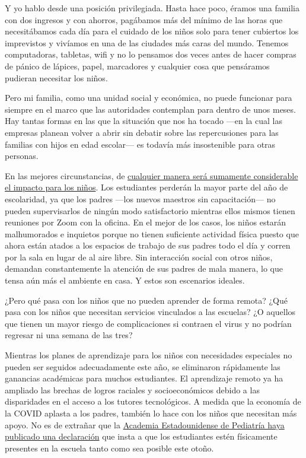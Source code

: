 Y yo hablo desde una posición privilegiada. Hasta hace poco, éramos una
familia con dos ingresos y con ahorros, pagábamos más del mínimo de las
horas que necesitábamos cada día para el cuidado de los niños solo para
tener cubiertos los imprevistos y vivíamos en una de las ciudades más
caras del mundo. Tenemos computadoras, tabletas, wifi y no lo pensamos
dos veces antes de hacer compras de pánico de lápices, papel, marcadores
y cualquier cosa que pensáramos pudieran necesitar los niños.

Pero mi familia, como una unidad social y económica, no puede funcionar
para siempre en el marco que las autoridades contemplan para dentro de
unos meses. Hay tantas formas en las que la situación que nos ha tocado
---en la cual las empresas planean volver a abrir sin debatir sobre las
repercusiones para las familias con hijos en edad escolar--- es todavía
más insostenible para otras personas.

En las mejores circunstancias, de
\href{https://www.nytimes3xbfgragh.onion/2020/06/05/us/coronavirus-education-lost-learning.html}{cualquier
manera será sumamente considerable el impacto para los niños}. Los
estudiantes perderán la mayor parte del año de escolaridad, ya que los
padres ---los nuevos maestros sin capacitación--- no pueden
supervisarlos de ningún modo satisfactorio mientras ellos mismos tienen
reuniones por Zoom con la oficina. En el mejor de los casos, los niños
estarán malhumorados e inquietos porque no tienen suficiente actividad
física puesto que ahora están atados a los espacios de trabajo de sus
padres todo el día y corren por la sala en lugar de al aire libre. Sin
interacción social con otros niños, demandan constantemente la atención
de sus padres de mala manera, lo que tensa aún más el ambiente en casa.
Y estos son escenarios ideales.

¿Pero qué pasa con los niños que no pueden aprender de forma remota?
¿Qué pasa con los niños que necesitan servicios vinculados a las
escuelas? ¿O aquellos que tienen un mayor riesgo de complicaciones si
contraen el virus y no podrían regresar ni una semana de las tres?

Mientras los planes de aprendizaje para los niños con necesidades
especiales no pueden ser seguidos adecuadamente este año, se eliminaron
rápidamente las ganancias académicas para muchos estudiantes. El
aprendizaje remoto ya ha ampliado las brechas de logros raciales y
socioeconómicos debido a las disparidades en el acceso a los tutores
tecnológicos. A medida que la economía de la COVID aplasta a los padres,
también lo hace con los niños que necesitan más apoyo. No es de extrañar
que la
\href{https://www.nytimes3xbfgragh.onion/2020/06/30/us/coronavirus-schools-reopening-guidelines-aap.html}{Academia
Estadounidense de Pediatría haya publicado una declaración} que insta a
que los estudiantes estén físicamente presentes en la escuela tanto como
sea posible este otoño.


